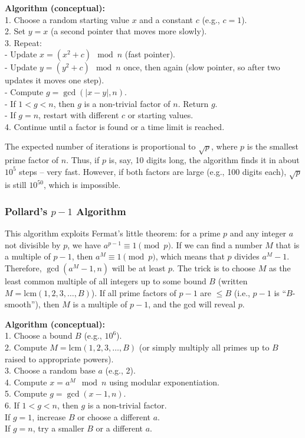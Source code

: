 \textbf{Algorithm (conceptual):}
\\1. Choose a random starting value \(x\) and a constant \(c\) (e.g., \(c=1\)).
\\2. Set \(y = x\) (a second pointer that moves more slowly).
\\3. Repeat:
   \\- Update \(x = (x^2 + c) \mod n\) (fast pointer).
  \\ - Update \(y = (y^2 + c) \mod n\) once, then again (slow pointer, so after two updates it moves one step).
  \\ - Compute \(g = \gcd(|x-y|, n)\).
   \\- If \(1 < g < n\), then \(g\) is a non-trivial factor of \(n\). Return \(g\).
  \\ - If \(g = n\), restart with different \(c\) or starting values.
\\4. Continue until a factor is found or a time limit is reached.

The expected number of iterations is proportional to \(\sqrt{p}\), where \(p\) is the smallest prime factor of \(n\). Thus, if \(p\) is, say, 10 digits long, the algorithm finds it in about \(10^5\) steps – very fast. However, if both factors are large (e.g., 100 digits each), \(\sqrt{p}\) is still \(10^{50}\), which is impossible.

\subsubsection{Pollard’s \(p-1\) Algorithm}

This algorithm exploits Fermat’s little theorem: for a prime \(p\) and any integer \(a\) not divisible by \(p\), we have \(a^{p-1} \equiv 1 \pmod{p}\). If we can find a number \(M\) that is a multiple of \(p-1\), then \(a^M \equiv 1 \pmod{p}\), which means that \(p\) divides \(a^M - 1\). Therefore, \(\gcd(a^M - 1, n)\) will be at least \(p\). The trick is to choose \(M\) as the least common multiple of all integers up to some bound \(B\) (written \(M = \mathrm{lcm}(1,2,3,\dots,B)\)). If all prime factors of \(p-1\) are \(\le B\) (i.e., \(p-1\) is “\(B\)-smooth”), then \(M\) is a multiple of \(p-1\), and the gcd will reveal \(p\).

\textbf{Algorithm (conceptual):}
\\1. Choose a bound \(B\) (e.g., \(10^6\)).
\\2. Compute \(M = \mathrm{lcm}(1,2,3,\dots,B)\) (or simply multiply all primes up to \(B\) raised to appropriate powers).
\\3. Choose a random base \(a\) (e.g., 2).
\\4. Compute \(x = a^M \mod n\) using modular exponentiation.
\\5. Compute \(g = \gcd(x-1, n)\).
\\6. If \(1 < g < n\), then \(g\) is a non-trivial factor.
\\If \(g = 1\), increase \(B\) or choose a different \(a\).
\\If \(g = n\), try a smaller \(B\) or a different \(a\).

